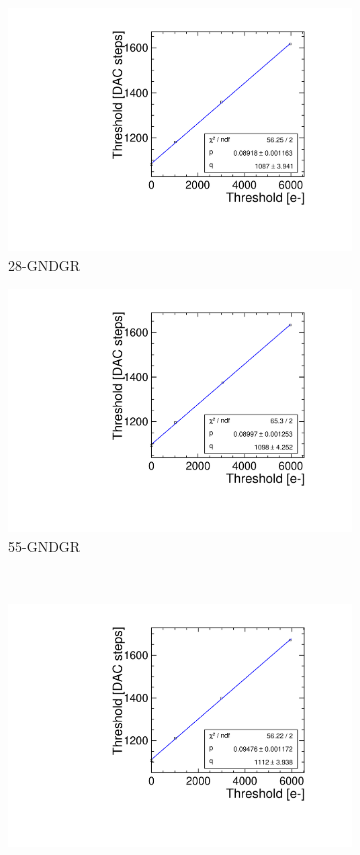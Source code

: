 \begin{figure}[htbp]
\begin{subfigure}[b]{0.45\textwidth}
    \includegraphics[width=\textwidth]{./figures/Calibration/THLcalibration_W0019_L08.pdf}
    \caption{28-GNDGR}
  \end{subfigure} \hfill
  \begin{subfigure}[b]{0.45\textwidth}
    \includegraphics[width=\textwidth]{./figures/Calibration/THLcalibration_W0019_C07.pdf}
    \caption{55-GNDGR}
  \end{subfigure}\\
  \begin{subfigure}[b]{0.45\textwidth}
    \includegraphics[width=\textwidth]{./figures/Calibration/THLcalibration_W0005_E02.pdf}

\end{subfigure}
\end{figure}
